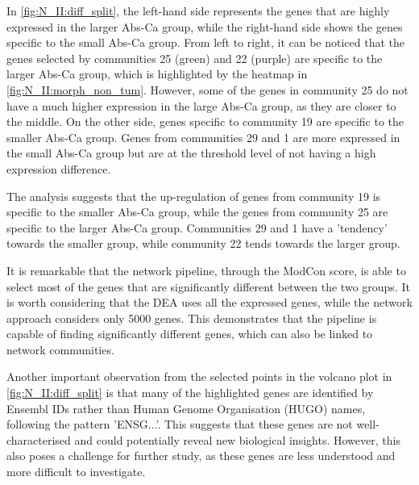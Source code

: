 
In \cref{fig:N_II:diff_split}, the left-hand side represents the genes that are highly expressed in the larger Abs-Ca group, while the right-hand side shows the genes specific to the small Abs-Ca group. From left to right, it can be noticed that the genes selected by communities 25 (green) and 22 (purple) are specific to the larger Abs-Ca group, which is highlighted by the heatmap in \cref{fig:N_II:morph_non_tum}. However, some of the genes in community 25 do not have a much higher expression in the large Abs-Ca group, as they are closer to the middle. On the other side, genes specific to community 19 are specific to the smaller Abs-Ca group. Genes from communities 29 and 1 are more expressed in the small Abs-Ca group but are at the threshold level of not having a high expression difference.

The analysis suggests that the up-regulation of genes from community 19 is specific to the smaller Abs-Ca group, while the genes from community 25 are specific to the larger Abs-Ca group. Communities 29 and 1 have a 'tendency' towards the smaller group, while community 22 tends towards the larger group.

It is remarkable that the network pipeline, through the ModCon score, is able to select most of the genes that are significantly different between the two groups. It is worth considering that the DEA uses all the expressed genes, while the network approach considers only 5000 genes. This demonstrates that the pipeline is capable of finding significantly different genes, which can also be linked to network communities.

Another important observation from the selected points in the volcano plot in \cref{fig:N_II:diff_split} is that many of the highlighted genes are identified by Ensembl IDs rather than Human Genome Organisation (HUGO) names, following the pattern 'ENSG...'. This suggests that these genes are not well-characterised and could potentially reveal new biological insights. However, this also poses a challenge for further study, as these genes are less understood and more difficult to investigate.


